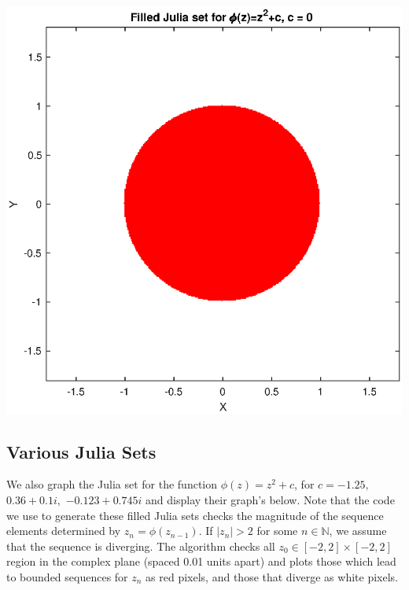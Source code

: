 \documentclass[12pt]{article}
\def\N{\mathbb{N}}
\begin{document}
				
		
			\begin{center}
			\includegraphics[width=0.5\linewidth]{JSC1}
			\end{center}
	
\subsection{Various Julia Sets} \label{prob2}	
	
	We also graph the Julia set for the function $\phi(z)=z^2+c$, for $c=-1.25,$ $0.36+0.1i,$ $-0.123+0.745i$ and display their graph's below. Note that the code we use to generate these filled Julia sets checks the magnitude of the sequence elements determined by $z_n=\phi(z_{n-1})$. If $|z_n|>2$ for some $n\in \N$, we assume that the sequence is diverging. The algorithm checks all $z_0 \in [-2,2] \times [-2,2]$ region in the complex plane (spaced 0.01 units apart) and plots those which lead to bounded sequences for $z_n$ as red pixels, and those that diverge as white pixels. \\


	
		
\end{document}
